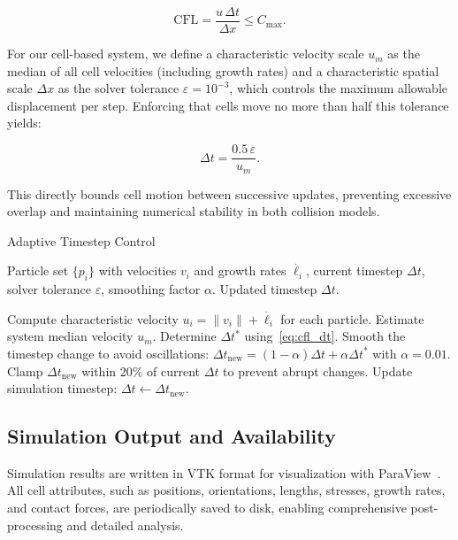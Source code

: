 \documentclass[conference]{IEEEtran}
\begin{document}
\begin{equation}
    \text{CFL} = \frac{u \, \Delta t}{\Delta x} \leq C_{\text{max}}.
\end{equation}

For our cell-based system, we define a characteristic velocity scale $u_m$ as the median of all cell velocities (including growth rates) and a characteristic spatial scale $\Delta x$ as the solver tolerance $\varepsilon = 10^{-3}$, which controls the maximum allowable displacement per step. Enforcing that cells move no more than half this tolerance yields:

\begin{equation} \label{eq:cfl_dt}
    \Delta t = \frac{0.5 \, \varepsilon}{u_m}.
\end{equation}

This directly bounds cell motion between successive updates, preventing excessive overlap and maintaining numerical stability in both collision models.

\begin{algorithm}[H]
    \caption{Adaptive Timestep Control}
    \label{alg:adaptive_dt}
    \begin{algorithmic}[1]
        \Require Particle set $\{p_i\}$ with velocities $v_i$ and growth rates $\dot{\ell_i}$, current timestep $\Delta t$, solver tolerance $\varepsilon$, smoothing factor $\alpha$.
        \Ensure Updated timestep $\Delta t$.

        \State Compute characteristic velocity $u_i = \|v_i\| + \dot{\ell_i}$ for each particle.
        \State Estimate system median velocity $u_m$.
        \State Determine $\Delta t^*$ using~\autoref{eq:cfl_dt}.
        \State Smooth the timestep change to avoid oscillations: $\Delta t_{\text{new}} = (1 - \alpha)\Delta t + \alpha \Delta t^*$ with $\alpha = 0.01$.
        \State Clamp $\Delta t_{\text{new}}$ within 20\% of current $\Delta t$ to prevent abrupt changes.
        \State Update simulation timestep: $\Delta t \gets \Delta t_{\text{new}}$.
    \end{algorithmic}
\end{algorithm}

\subsection{Simulation Output and Availability}

Simulation results are written in VTK format for visualization with ParaView~\cite{ahrens2005paraview}. All cell attributes, such as positions, orientations, lengths, stresses, growth rates, and contact forces, are periodically saved to disk, enabling comprehensive post-processing and detailed analysis.
\end{document}
